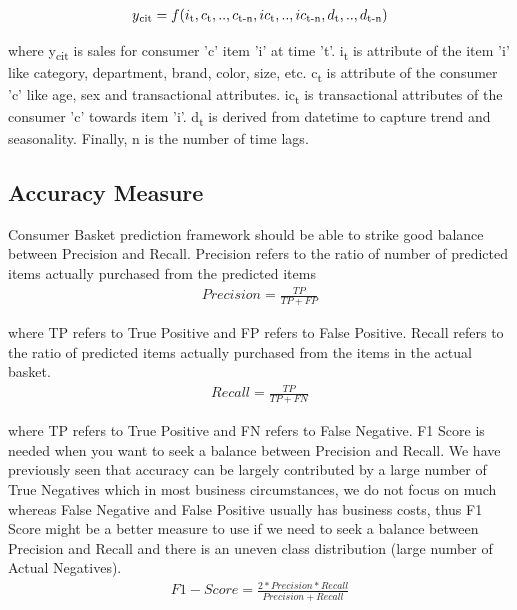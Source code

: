   \begin{equation}
    \begin{array}{l}
      y\textsubscript{cit}  = f(i\textsubscript{t}, c\textsubscript{t},..,c\textsubscript{t-n}, ic\textsubscript{t}
      ,..,ic\textsubscript{t-n}, d\textsubscript{t},..,d\textsubscript{t-n})
    \end{array}
    \label{eqn:fx}
  \end{equation}

where y\textsubscript{cit} is sales for consumer 'c' item ’i’ at time ’t’. 
i\textsubscript{t} is attribute of the item ’i’ like category, department, brand, color, size, etc. 
c\textsubscript{t} is attribute of the consumer 'c' like age, sex and transactional attributes. 
ic\textsubscript{t} is transactional attributes of the consumer 'c'  towards item 'i'. 
d\textsubscript{t} is derived from datetime to capture trend and seasonality. 
Finally, n is the number of time lags.

\subsection{Accuracy Measure}
Consumer Basket prediction framework should be able to strike good balance between Precision and Recall. 
Precision refers to the ratio of number of predicted items actually purchased from the predicted items
  \begin{equation}
      \begin{array}{l}
        Precision = \frac{TP} {TP + FP}
      \end{array}
    \label{eqn:Precision}
  \end{equation}

where TP refers to True Positive and FP refers to False Positive.
Recall refers to the ratio of predicted items actually purchased from the items in the actual basket. 
  \begin{equation}
      \begin{array}{l}
        Recall = \frac{TP} {TP + FN}
        \end{array}
    \label{eqn:Recall}
  \end{equation}

where TP refers to True Positive and FN refers to False Negative.
F1 Score is needed when you want to seek a balance between Precision and Recall.
We have previously seen that accuracy can be largely contributed by a large number of True Negatives which 
in most business circumstances, we do not focus on much whereas False Negative and False Positive usually has 
business costs, thus F1 Score might be a better measure to use if we need to seek a balance
between Precision and Recall and there is an uneven class distribution (large number of Actual Negatives).
  \begin{equation}
      \begin{array}{l}
        F1-Score = \frac{2 * Precision * Recall} {Precision + Recall}
      \end{array}
    \label{eqn:F1}
  \end{equation}

